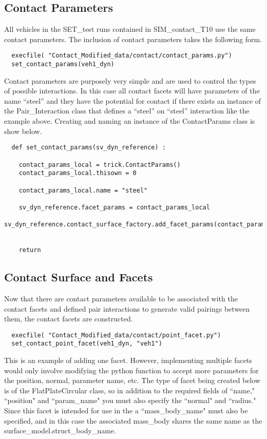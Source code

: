 \subsection{Contact Parameters}
All vehicles in the SET\_test runs contained in SIM\_contact\_T10 use the same contact parameters. The inclusion of contact parameters takes the following form.
\begin{verbatim}
  execfile( "Contact_Modified_data/contact/contact_params.py")
  set_contact_params(veh1_dyn)
\end{verbatim}
Contact parameters are purposely very simple and are used to control the types of possible interactions.  In this case all contact facets will have parameters of the name ``steel'' and they have the potential for contact if there exists an instance of the Pair\_Interaction class that defines a ``steel'' on ``steel'' interaction like the example above. Creating and naming an instance of the ContactParams class is show below.
\begin{verbatim}
  def set_contact_params(sv_dyn_reference) :

    contact_params_local = trick.ContactParams()
    contact_params_local.thisown = 0

    contact_params_local.name = "steel"

    sv_dyn_reference.facet_params = contact_params_local
    sv_dyn_reference.contact_surface_factory.add_facet_params(contact_params_local)


    return
\end{verbatim}

\subsection{Contact Surface and Facets}
Now that there are contact parameters available to be associated with the contact facets and defined pair interactions to generate valid pairings between them, the contact facets are constructed.
\begin{verbatim}
  execfile( "Contact_Modified_data/contact/point_facet.py")
  set_contact_point_facet(veh1_dyn, "veh1")
\end{verbatim}

This is an example of adding one facet. However, implementing multiple facets would only involve modifying the python function to accept more parameters for the position, normal, parameter name, etc. The type of facet being created below is of the FlatPlateCircular class, so in addition to the required fields of ``name," ``position" and ``param\_name" you must also specify the ``normal" and ``radius." Since this facet is intended for use in the \ModelDesc a ``mass\_body\_name" must also be specified, and in this case the associated mass\_body shares the same name as the surface\_model.struct\_body\_name.

